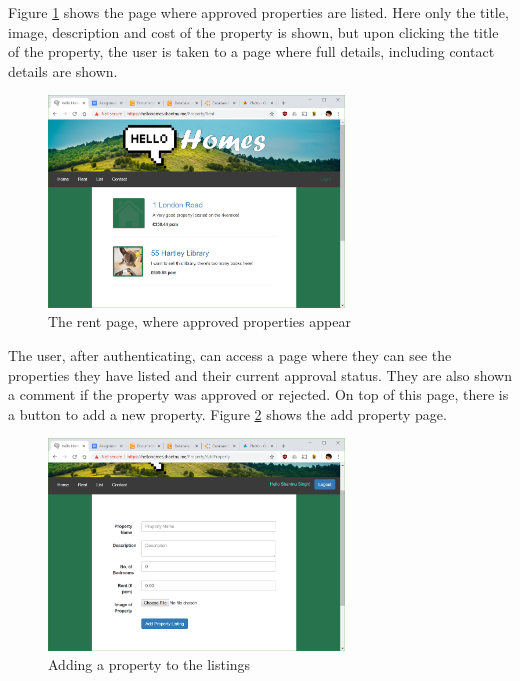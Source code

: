 \documentclass{article}
\begin{document}
        \par
            Figure \ref{fig:rent_page} shows the page where approved properties are listed.
            Here only the title, image, description and cost of the property is shown, but upon clicking the title of the property, the user is taken to a page where full details, including contact details are shown.

            \begin{figure}[ht]
                \centering
                \includegraphics[width=0.7\textwidth]{figures/rent.png}
                \caption[Rent Page]{The rent page, where approved properties appear}
                \label{fig:rent_page}
            \end{figure}

        \par
            The user, after authenticating, can access a page where they can see the properties they have listed and their current approval status.
            They are also shown a comment if the property was approved or rejected.
            On top of this page, there is a button to add a new property.
            Figure \ref{fig:add_property} shows the add property page.

            \begin{figure}[ht]
                \centering
                \includegraphics[width=0.7\textwidth]{figures/add_property.png}
                \caption[Add Property]{Adding a property to the listings}
                \label{fig:add_property}
            \end{figure}
\end{document}
